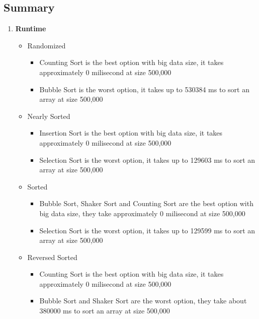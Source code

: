 \documentclass[11pt,a4paper]{article}
\begin{document}
{{	\subsection{Summary}
	    \begin{enumerate}
	        \item \textbf{Runtime}
	            \begin{itemize}
	                \item Randomized 
	                \begin{itemize}
	                    \item Counting Sort is the best option with big data size, it takes approximately 0 milisecond at size 500,000
	                    \item Bubble Sort is the worst option, it takes up to 530384 ms to sort an array at size 500,000
	                \end{itemize}
	                \item Nearly Sorted
	                \begin{itemize}
	                    \item Insertion Sort is the best option with big data size, it takes approximately 0 milisecond at size 500,000
	                    \item Selection Sort is the worst option, it takes up to 129603 ms to sort an array at size 500,000
	                \end{itemize}
	                \item Sorted
	                \begin{itemize}
	                    \item Bubble Sort, Shaker Sort and Counting Sort are the best option with big data size, they take approximately 0 milisecond at size 500,000
	                    \item Selection Sort is the worst option, it takes up to 129599 ms to sort an array at size 500,000
	                \end{itemize}
	                \item Reversed Sorted
	                \begin{itemize}
	                    \item Counting Sort is the best option with big data size, it takes approximately 0 milisecond at size 500,000
	                    \item Bubble Sort and Shaker Sort are the worst option, they take about 380000 ms to sort an array at size 500,000
	                \end{itemize}

\end{itemize}
\end{enumerate}}}
\end{document}
